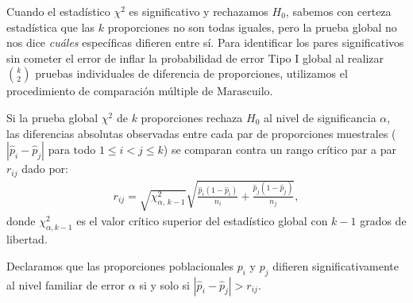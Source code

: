 Cuando el estadístico $\chi^2$ es significativo y rechazamos $H_0$, sabemos con certeza estadística que las $k$ proporciones no son todas iguales, pero la prueba global no nos dice \emph{cuáles} específicas difieren entre sí. Para identificar los pares significativos sin cometer el error de inflar la probabilidad de error Tipo I global al realizar $\binom{k}{2}$ pruebas individuales de diferencia de proporciones, utilizamos el procedimiento de comparación múltiple de Marascuilo.

\begin{teorema}
	Si la prueba global $\chi^2$ de $k$ proporciones rechaza $H_0$ al nivel de significancia $\alpha$, las diferencias absolutas observadas entre cada par de proporciones muestrales ($|\hat{p}_i - \hat{p}_j|$ para todo $1 \leq i < j \leq k$) se comparan contra un rango crítico par a par $r_{ij}$ dado por:
	\begin{align}
		r_{ij} = \sqrt{\chi^2_{\alpha, \, k-1}} \sqrt{\frac{\hat{p}_i(1-\hat{p}_i)}{n_i} + \frac{\hat{p}_j(1-\hat{p}_j)}{n_j}},
		\label{eq:marascuilo}
	\end{align}
	donde $\chi^2_{\alpha, k-1}$ es el valor crítico superior del estadístico global con $k-1$ grados de libertad.

	Declaramos que las proporciones poblacionales $p_i$ y $p_j$ difieren significativamente al nivel familiar de error $\alpha$ si y solo si $|\hat{p}_i - \hat{p}_j| > r_{ij}$.
\end{teorema}
